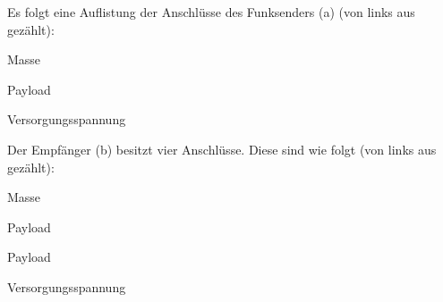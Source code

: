 \begin{figure}[H]
	\hspace*{-2cm}
	\caption{\funkempfaenger}
	\label{img:433_sender_empf}
\end{figure}

Es folgt eine Auflistung der Anschlüsse des Funksenders (a) (von links aus gezählt):

\begin{description}[style=multiline,leftmargin=3cm]
\item [GND] 	Masse
\item [DATA]	Payload
\item [VCC]		Versorgungsspannung
\end{description}

Der Empfänger (b) besitzt vier Anschlüsse. Diese sind wie folgt (von links aus gezählt):

\begin{description}[style=multiline,leftmargin=3cm]
\item [GND] 	Masse
\item [DATA]	Payload
\item [DATA]	Payload
\item [VCC]		Versorgungsspannung
\end{description}

